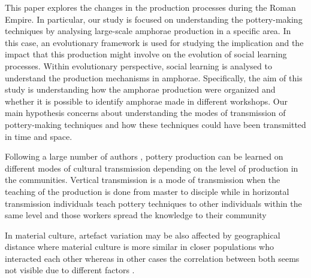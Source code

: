 \documentclass[review]{elsarticle}
\begin{document}
This paper explores the changes in the production processes during the Roman Empire. In particular, our study is focused on understanding the pottery-making techniques by analysing large-scale amphorae production in a specific area. In this case, an evolutionary framework \citep{mesoudi_cultural_2015, shennan_evolution_2008} is used for studying the implication and the impact that this production might involve on the  evolution of social learning processes. Within evolutionary perspective, social learning is analysed to understand the production mechanisms in amphorae. Specifically, the aim of this study is understanding how the amphorae production were organized and whether it is possible to identify amphorae made in different workshops. Our main hypothesis concerns about understanding the modes of transmission of pottery-making techniques and how these techniques could have been transmitted in time and space. 

Following a large number of authors \citep{cavalli-sforza_cultural_1981, hosfield_modes_2009}, pottery production can be learned on different modes of cultural transmission depending on the level of production in the communities. Vertical transmission is a mode of transmission when the teaching of the production is done from master to disciple while in horizontal transmission individuals teach pottery techniques to other individuals within the same level and those workers spread the knowledge to their community \citep{epstein_craft_1998}

In material culture, artefact variation may be also affected by geographical distance \citep{bjorklund_effect_2010,shennan_isolation-by-distance_2015, van_strien_isolation-by-distance_2015} where material culture is more similar in closer populations who interacted each other whereas in other cases the correlation between both seems not visible due to different factors \citep{hart_effects_2012}. 
\end{document}

